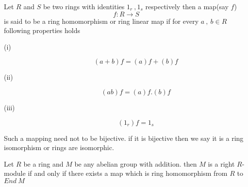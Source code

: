 \bigskip
\begin{defn}
	Let $R$ and $S$ be two rings with identities $1_r \ , 1_s$ respectively then a map(say $f$)
	\begin{equation*}
	f : R \rightarrow S
	\end{equation*}
	is said to be a ring homomorphism or ring linear map if for every $a \ ,\ b \in R$ following properties holds
	\begin{description}
		\item[(i) ]\begin{equation*}
		(a+b)f = (a)f +(b)f
		\end{equation*}
		\item[(ii)  ]\begin{equation*}
		(ab)f = (a)f . (b)f
		\end{equation*}
		\item[(iii) ]\begin{equation*}
		(1_r)f = 1_s
		\end{equation*}
	\end{description}
\end{defn}
\begin{remark}
	Such a mapping need not to be bijective. if it is bijective then we say it is a ring isomorphism or rings are isomorphic.
\end{remark}
\bigskip
\begin{thm}
	Let $R$ be a ring and $M$ be any abelian group with addition. then $M$ is a right $R$-module if and only if there exists a map which is ring homomorphism from $R$ to $End \ M$
\end{thm}
